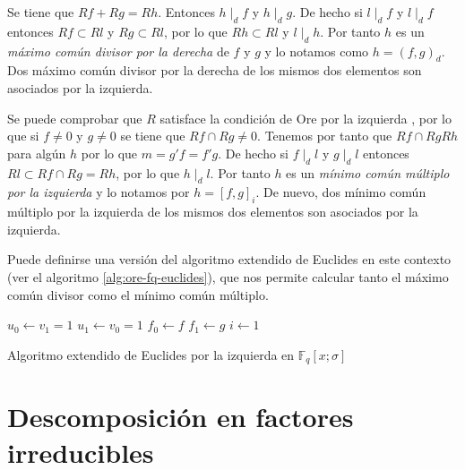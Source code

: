 Se tiene que \(Rf + Rg = Rh\).
Entonces \(h \mid_d f\) y \(h \mid_d g\).
De hecho si \(l \mid_d f\) y \(l \mid_d f\) entonces \(Rf \subset Rl\) y \(Rg \subset Rl\), por lo que \(Rh \subset Rl\) y \(l \mid_d h\).
Por tanto \(h\) es un \emph{máximo común divisor por la derecha} de \(f\) y \(g\) y lo notamos como \(h = (f, g)_d\).
Dos máximo común divisor por la derecha de los mismos dos elementos son asociados por la izquierda.

Se puede comprobar que \(R\) satisface la condición de Ore por la izquierda \parencite[ver][p. 4]{jacobson_finite-dimensional_1996}, por lo que si \(f \neq 0\) y \(g \neq 0\) se tiene que \(Rf \cap Rg \neq 0\).
Tenemos por tanto que \(Rf \cap Rg Rh\) para algún \(h\) por lo que \(m = g'f = f'g\).
De hecho si \(f \mid_d l\) y \(g \mid_d l\) entonces \(Rl \subset Rf \cap Rg = Rh\), por lo que \(h \mid_d l\).
Por tanto \(h\) es un \emph{mínimo común múltiplo por la izquierda} y lo notamos por \(h = [f, g]_i\).
De nuevo, dos mínimo común múltiplo por la izquierda de los mismos dos elementos son asociados por la izquierda.

Puede definirse una versión del algoritmo extendido de Euclides en este contexto (ver el algoritmo \ref{alg:ore-fq-euclides}), que nos permite calcular tanto el máximo común divisor como el mínimo común múltiplo.

\begin{Ualgorithm}[h]
  \DontPrintSemicolon
  \(u_0 \longleftarrow v_1 = 1\)\;
  \(u_1 \longleftarrow v_0 = 1\)\;
  \(f_0 \longleftarrow f\)\;
  \(f_1 \longleftarrow g\)\;
  \(i \longleftarrow 1\)\;
    \caption{Algoritmo extendido de Euclides por la izquierda en \(\mathbb F_q[x; \sigma]\)
  }
  \label{alg:ore-fq-euclides}
\end{Ualgorithm}
  
\section{Descomposición en factores irreducibles}

